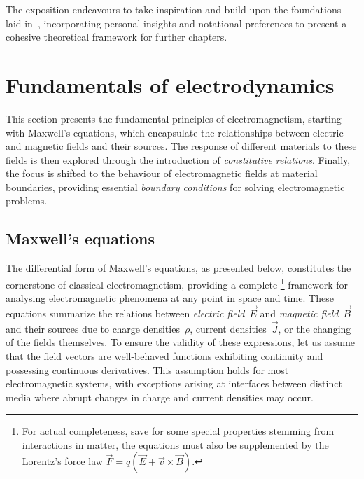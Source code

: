 \documentclass[11pt,a4paper,twoside,openany]{report}
\begin{document}
The exposition endeavours to take inspiration and build upon the foundations laid in~\parencite{balanis:advanced-engineering-electromagnetics,griffiths:introduction-to-electrodynamics,zangwill:modern-electrodynamics}, incorporating personal insights and notational preferences to present a cohesive theoretical framework for further chapters.

\section{Fundamentals of electrodynamics}
\label{section:fundamentals-of-electrodynamics}
This section presents the fundamental principles of electromagnetism, starting with Maxwell's equations, which encapsulate the relationships between electric and magnetic fields and their sources. The response of different materials to these fields is then explored through the introduction of \emph{constitutive relations}. Finally, the focus is shifted to the behaviour of electromagnetic fields at material boundaries, providing essential \emph{boundary conditions} for solving electromagnetic problems.

\subsection{Maxwell's equations}
\label{subsection:maxwells-equations}
The differential form of Maxwell's equations, as presented below, constitutes the cornerstone of classical electromagnetism, providing a complete%
    \footnote{For actual completeness, save for some special properties stemming from interactions in matter, the equations must also be supplemented by the Lorentz's force law $\vec F = q(\vec E + \vec v \times \vec B)$.}
framework for analysing electromagnetic phenomena at any point in space and time. These equations summarize the relations between \emph{electric field}~$\vec E$ and \emph{magnetic field}~$\vec B$ and their sources due to charge densities~$\rho$, current densities~$\vec J$, or the changing of the fields themselves. To ensure the validity of these expressions, let us assume that the field vectors are well-behaved functions exhibiting continuity and possessing continuous derivatives. This assumption holds for most electromagnetic systems, with exceptions arising at interfaces between distinct media where abrupt changes in charge and current densities may occur.
\end{document}
